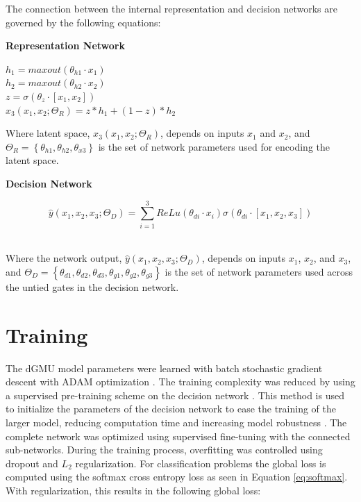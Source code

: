 \noindent
The connection between the internal representation and decision networks are governed by the following equations:

\noindent
\textbf{Representation Network}
\begin{center}
    $h_1 = maxout(\theta_{h1} \cdot x_1)$\\
    $h_2 = maxout(\theta_{h2} \cdot x_2)$\\
    $z = \sigma(\theta_z \cdot [x_1,x_2])$\\
    $x_3(x_1,x_2;\Theta_R) = z * h_1 + (1-z)*h_2$\\
\end{center}

\noindent
Where latent space, $x_3(x_1,x_2;\Theta_R)$, depends on inputs $x_1$ and $x_2$, and $\Theta_R = \left\{\theta_{h1},\theta_{h2},\theta_{x3}\right\}$ is the set of network parameters used for encoding the latent space.

\noindent
\textbf{Decision Network}

\begin{center}
    $$
        \hat{y}(x_1,x_2,x_3;\Theta_D) = {\sum^{3}_{i=1}} ReLu(\theta_{di} \cdot x_i)\sigma(\theta_{di} \cdot [x_1,x_2,x_3])
    $$\\   
\end{center}

\noindent
Where the network output, $\hat{y}(x_1,x_2,x_3;\Theta_D)$, depends on inputs $x_1$, $x_2$, and $x_3$, and $\Theta_D = \left\{\theta_{d1},\theta_{d2},\theta_{d3},\theta_{g1},\theta_{g2},\theta_{g3}\right\}$ is the set of network parameters used across the untied gates in the decision network.


\section{Training}


The dGMU model parameters were learned with batch stochastic gradient descent with ADAM optimization \cite{kingma2014adam}. The training complexity was reduced by using a supervised pre-training scheme on the decision network \cite{mahajan2018exploring}. This method is used to initialize the parameters of the decision network to ease the training of the larger model, reducing computation time and increasing model robustness \cite{clune2013evolutionary}. The complete network was optimized using supervised fine-tuning with the connected sub-networks. During the training process, overfitting was controlled using dropout and $L_2$ regularization. For classification problems the global loss is computed using the softmax cross entropy loss as seen in Equation \ref{eq:softmax}. With regularization, this results in the following global loss:


